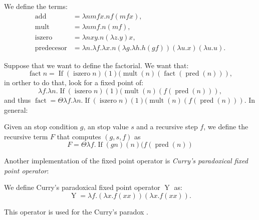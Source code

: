 \begin{definition}
  We define the terms:
  \begin{align*}
    \operatorname{add} &= \lambda nm f x.nf (mf x),\\
    \operatorname{mult} &= \lambda nm f.n(mf),\\
    \operatorname{iszero} &= \lambda nxy.n(\lambda z.y)x,\\
    \operatorname{predecesor} &=\lambda n.\lambda f.\lambda x. n (\lambda g.\lambda h. h (g f)) (\lambda u.x) (\lambda u.u). 
  \end{align*}
                                
\end{definition}
Suppose that we want to define the factorial. We want that:
$$\operatorname{fact} n = \operatorname{If}(\operatorname{iszero} n)(1)(\operatorname{mult}(n)(\operatorname{fact} (\operatorname{pred}(n))),$$
in orther to do that, look for a fixed point of:
$$\lambda f. \lambda n.\operatorname{If}(\operatorname{iszero}n)(1)(\operatorname{mult}(n)(f (\operatorname{pred}(n))),$$
and thus $\operatorname{fact}=\Theta \lambda f.\lambda n. \operatorname{If}(\operatorname{iszero}n)(1)(\operatorname{mult}(n)(f (\operatorname{pred}(n)))$. In general:

\begin{definition}
  Given an stop condition $g$, an stop value $s$ and a recursive step $f$, we define the recursive term $F$ that computes $(g,s,f)$ as
  $$F = \Theta \lambda f. \operatorname{If}(gn)(n)(f (\operatorname{pred}(n))$$
\end{definition}

Another implementation of the fixed point operator is \emph{Curry's paradoxical fixed point operator}:

\begin{definition}
  We define Curry's paradoxical fixed point operator $\operatorname{Y}$ as:
  $$\operatorname{Y}=\lambda f.(\lambda x.f(x x)) (\lambda x.f(x x)).$$
\end{definition}

This operator is used for the Curry's paradox \cite{sep-curry-paradox}.\\




